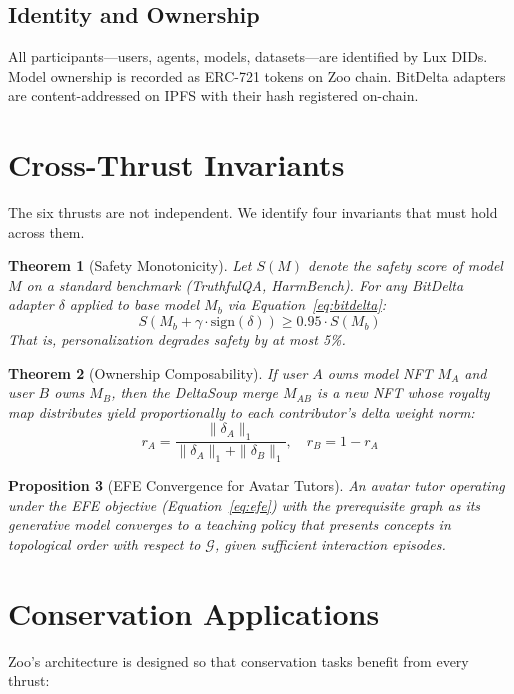 \documentclass[11pt,letterpaper]{article}
\newtheorem{theorem}{Theorem}[section]
\newtheorem{proposition}[theorem]{Proposition}
\begin{document}
\subsection{Identity and Ownership}

All participants---users, agents, models, datasets---are identified by Lux DIDs. Model ownership is recorded as ERC-721 tokens on Zoo chain. BitDelta adapters are content-addressed on IPFS with their hash registered on-chain.

\section{Cross-Thrust Invariants}

The six thrusts are not independent. We identify four invariants that must hold across them.

\begin{theorem}[Safety Monotonicity]
\label{thm:safety}
Let $S(M)$ denote the safety score of model $M$ on a standard benchmark (TruthfulQA, HarmBench). For any BitDelta adapter $\delta$ applied to base model $M_b$ via Equation~\ref{eq:bitdelta}:
\[
S(M_b + \gamma \cdot \text{sign}(\delta)) \geq 0.95 \cdot S(M_b)
\]
That is, personalization degrades safety by at most 5\%.
\end{theorem}

\begin{theorem}[Ownership Composability]
\label{thm:compose}
If user $A$ owns model NFT $M_A$ and user $B$ owns $M_B$, then the DeltaSoup merge $M_{AB}$ is a new NFT whose royalty map distributes yield proportionally to each contributor's delta weight norm:
\[
r_A = \frac{\|\delta_A\|_1}{\|\delta_A\|_1 + \|\delta_B\|_1}, \quad r_B = 1 - r_A
\]
\end{theorem}

\begin{proposition}[EFE Convergence for Avatar Tutors]
An avatar tutor operating under the EFE objective (Equation~\ref{eq:efe}) with the prerequisite graph as its generative model converges to a teaching policy that presents concepts in topological order with respect to $\mathcal{G}$, given sufficient interaction episodes.
\end{proposition}

\section{Conservation Applications}

Zoo's architecture is designed so that conservation tasks benefit from every thrust:
\end{document}
